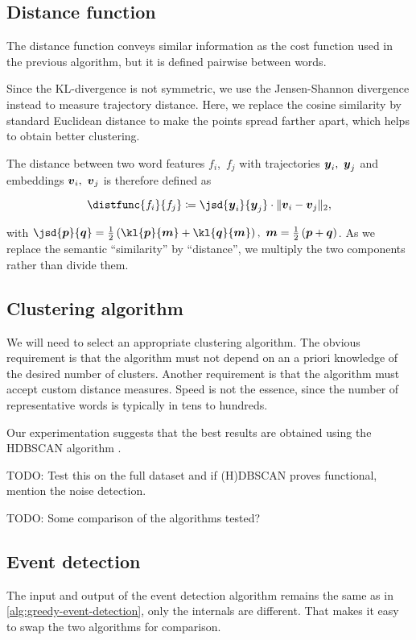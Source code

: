 \subsection{Distance function}
The distance function conveys similar information as the cost function used in the previous algorithm, but it is defined pairwise between words.

Since the KL-divergence is not symmetric, we use the Jensen-Shannon divergence instead to measure trajectory distance. Here, we replace the cosine similarity by standard Euclidean distance to make the points spread farther apart, which helps to obtain better clustering.

The distance between two word features $f_{i}$,\ $f_{j}$ with trajectories $\vect{\traj}_{i},\ \vect{\traj}_{j}$ and embeddings $\embed_{i},\ \embed_{j}$ is therefore defined as

\begin{equation}
	\distfunc{f_{i}}{f_{j}} \coloneqq \jsd{\vect{\traj}_{i}}{\vect{\traj}_{j}} \cdot \| \embed_{i} - \embed_{j}\|_{2},
\end{equation}

with $\jsd{\vect{p}}{\vect{q}} = \frac{1}{2} \left( \kl{\vect{p}}{\vect{m}} + \kl{\vect{q}}{\vect{m}} \right) ,\ \vect{m} = \frac{1}{2} \left( \vect{p} + \vect{q} \right)$. As we replace the semantic ``similarity'' by ``distance'', we multiply the two components rather than divide them.


\subsection{Clustering algorithm}
We will need to select an appropriate clustering algorithm. The obvious requirement is that the algorithm must not depend on an a priori knowledge of the desired number of clusters. Another requirement is that the algorithm must accept custom distance measures. Speed is not the essence, since the number of representative words is typically in tens to hundreds.

Our experimentation suggests that the best results are obtained using the HDBSCAN algorithm \cite{hdbscan}.

{\color{red} TODO: Test this on the full dataset and if (H)DBSCAN proves functional, mention the noise detection.}

{\color{blue} TODO: Some comparison of the algorithms tested?}


\subsection{Event detection}
The input and output of the event detection algorithm remains the same as in \ref{alg:greedy-event-detection}, only the internals are different. That makes it easy to swap the two algorithms for comparison.

